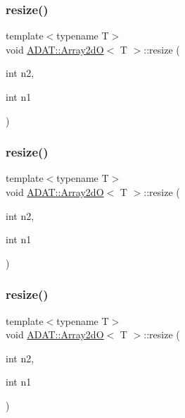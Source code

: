 \subsubsection{\texorpdfstring{resize()}{resize()}\hspace{0.1cm}{\footnotesize\ttfamily [1/6]}}
{\footnotesize\ttfamily template$<$typename T$>$ \\
void \mbox{\hyperlink{classADAT_1_1Array2dO}{A\+D\+A\+T\+::\+Array2dO}}$<$ T $>$\+::resize (\begin{DoxyParamCaption}\item[{int}]{n2,  }\item[{int}]{n1 }\end{DoxyParamCaption})\hspace{0.3cm}{\ttfamily [inline]}}

\mbox{\label{classADAT_1_1Array2dO_abccbac468c29e2d8a24b9cd317e92247}} 
\subsubsection{\texorpdfstring{resize()}{resize()}\hspace{0.1cm}{\footnotesize\ttfamily [2/6]}}
{\footnotesize\ttfamily template$<$typename T$>$ \\
void \mbox{\hyperlink{classADAT_1_1Array2dO}{A\+D\+A\+T\+::\+Array2dO}}$<$ T $>$\+::resize (\begin{DoxyParamCaption}\item[{int}]{n2,  }\item[{int}]{n1 }\end{DoxyParamCaption})\hspace{0.3cm}{\ttfamily [inline]}}

\mbox{\label{classADAT_1_1Array2dO_abccbac468c29e2d8a24b9cd317e92247}} 
\subsubsection{\texorpdfstring{resize()}{resize()}\hspace{0.1cm}{\footnotesize\ttfamily [3/6]}}
{\footnotesize\ttfamily template$<$typename T$>$ \\
void \mbox{\hyperlink{classADAT_1_1Array2dO}{A\+D\+A\+T\+::\+Array2dO}}$<$ T $>$\+::resize (\begin{DoxyParamCaption}\item[{int}]{n2,  }\item[{int}]{n1 }\end{DoxyParamCaption})\hspace{0.3cm}{\ttfamily [inline]}}

